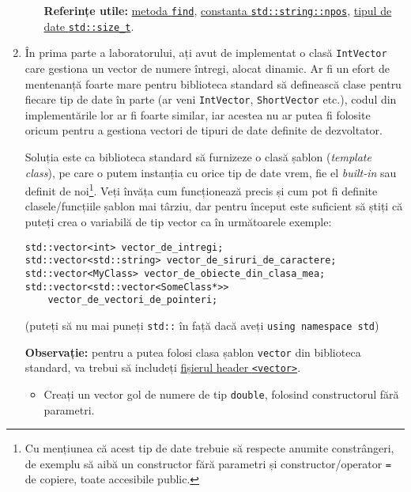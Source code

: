 \begin{enumerate}
\begin{itemize}
        \textbf{Referințe utile:} \href{https://en.cppreference.com/w/cpp/string/basic_string/find}{metoda \texttt{find}}, \href{https://en.cppreference.com/w/cpp/string/basic_string/npos}{constanta \texttt{std::string::npos}}, \href{https://en.cppreference.com/w/cpp/types/size_t}{tipul de date \texttt{std::size\_t}}.
    \end{itemize}


    \item În prima parte a laboratorului, ați avut de implementat o clasă \texttt{IntVector} care gestiona un vector de numere întregi, alocat dinamic. Ar fi un efort de mentenanță foarte mare pentru biblioteca standard să definească clase pentru fiecare tip de date în parte (ar veni \texttt{IntVector}, \texttt{ShortVector} etc.), codul din implementările lor ar fi foarte similar, iar acestea nu ar putea fi folosite oricum pentru a gestiona vectori de tipuri de date definite de dezvoltator.
    
    Soluția este ca biblioteca standard să furnizeze o clasă șablon (\textit{template class}), pe care o putem instanția cu orice tip de date vrem, fie el \textit{built-in} sau definit de noi\footnote{Cu mențiunea că acest tip de date trebuie să respecte anumite constrângeri, de exemplu să aibă un constructor fără parametri și constructor/operator \texttt{=} de copiere, toate accesibile public.}. Veți învăța cum funcționează precis și cum pot fi definite clasele/funcțiile șablon mai târziu, dar pentru început este suficient să știți că puteți crea o variabilă de tip vector ca în următoarele exemple:
    \begin{lstlisting}
std::vector<int> vector_de_intregi;
std::vector<std::string> vector_de_siruri_de_caractere;
std::vector<MyClass> vector_de_obiecte_din_clasa_mea;
std::vector<std::vector<SomeClass*>>
    vector_de_vectori_de_pointeri;
    \end{lstlisting}
    (puteți să nu mai puneți \texttt{std::} în față dacă aveți \texttt{using namespace std})

    \textbf{Observație:} pentru a putea folosi clasa șablon \texttt{vector} din biblioteca standard, va trebui să includeți \href{https://en.cppreference.com/w/cpp/header/vector}{fișierul header \texttt{<vector>}}.

    \begin{itemize}
        \item Creați un vector gol de numere de tip \texttt{double}, folosind constructorul fără parametri.


\end{itemize}
\end{enumerate}
